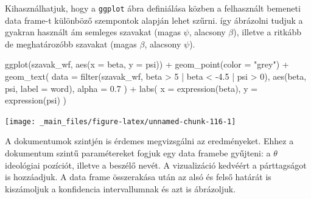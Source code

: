 \documentclass[
]{book}
\newenvironment{Shaded}{\begin{snugshade}}{\end{snugshade}}
\newcommand{\AttributeTok}[1]{\textcolor[rgb]{0.77,0.63,0.00}{#1}}
\newcommand{\DecValTok}[1]{\textcolor[rgb]{0.00,0.00,0.81}{#1}}
\newcommand{\FloatTok}[1]{\textcolor[rgb]{0.00,0.00,0.81}{#1}}
\newcommand{\FunctionTok}[1]{\textcolor[rgb]{0.00,0.00,0.00}{#1}}
\newcommand{\NormalTok}[1]{#1}
\newcommand{\SpecialCharTok}[1]{\textcolor[rgb]{0.00,0.00,0.00}{#1}}
\newcommand{\StringTok}[1]{\textcolor[rgb]{0.31,0.60,0.02}{#1}}
\begin{document}
Kihasználhatjuk, hogy a \texttt{ggplot} ábra definiálása közben a
felhasznált bemeneti data frame-t különböző szempontok alapján lehet
szűrni. így ábrázolni tudjuk a gyakran használt ám semleges szavakat
(magas \(\psi\), alacsony \(\beta\)), illetve a ritkább de meghatározóbb
szavakat (magas \(\beta\), alacsony \(\psi\)).

\begin{Shaded}
\begin{Highlighting}[]
\FunctionTok{ggplot}\NormalTok{(szavak\_wf, }\FunctionTok{aes}\NormalTok{(}\AttributeTok{x =}\NormalTok{ beta, }\AttributeTok{y =}\NormalTok{ psi)) }\SpecialCharTok{+}
  \FunctionTok{geom\_point}\NormalTok{(}\AttributeTok{color =} \StringTok{"grey"}\NormalTok{) }\SpecialCharTok{+}
  \FunctionTok{geom\_text}\NormalTok{(}
    \AttributeTok{data =} \FunctionTok{filter}\NormalTok{(szavak\_wf, beta }\SpecialCharTok{\textgreater{}} \DecValTok{5} \SpecialCharTok{|}\NormalTok{ beta }\SpecialCharTok{\textless{}} \SpecialCharTok{{-}}\FloatTok{4.5} \SpecialCharTok{|}\NormalTok{ psi }\SpecialCharTok{\textgreater{}} \DecValTok{0}\NormalTok{),}
    \FunctionTok{aes}\NormalTok{(beta, psi, }\AttributeTok{label =}\NormalTok{ word),}
    \AttributeTok{alpha =} \FloatTok{0.7}
\NormalTok{  ) }\SpecialCharTok{+}
  \FunctionTok{labs}\NormalTok{(}
    \AttributeTok{x =} \FunctionTok{expression}\NormalTok{(beta),}
    \AttributeTok{y =} \FunctionTok{expression}\NormalTok{(psi)}
\NormalTok{  )}
\end{Highlighting}
\end{Shaded}

\begin{center}\texttt{[image: \_main\_files/figure-latex/unnamed-chunk-116-1]} \end{center}

A dokumentumok szintjén is érdemes megvizsgálni az eredményeket. Ehhez a
dokumentum szintű paramétereket fogjuk egy data framebe gyűjteni: a
\(\theta\) ideológiai pozíciót, illetve a beszélő nevét. A vizualizáció
kedvéért a párttagságot is hozzáadjuk. A data frame összerakása után az
alsó és felső határát is kiszámoljuk a konfidencia intervallumnak és azt
is ábrázoljuk.
\end{document}
